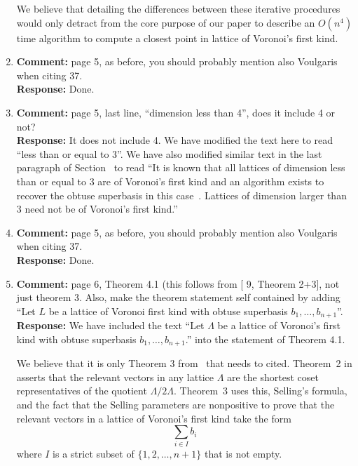 \documentclass[a4paper,10pt]{article}
\begin{document}
\begin{enumerate}
We believe that detailing the differences between these iterative procedures would only detract from the core purpose of our paper to describe an $O(n^4)$ time algorithm to compute a closest point in lattice of Voronoi's first kind.

\item\textbf{Comment:}  
page 5, as before, you should probably mention also Voulgaris when citing 37. 
\\\textbf{Response:}
Done.

\item\textbf{Comment:}  
page 5, last line, ``dimension less than 4'', does it include 4 or not? 
\\\textbf{Response:}
It does not include 4.  We have modified the text here to read ``less than or equal to $3$''. We have also modified similar text in the last paragraph of Section~ to read ``It is known that all lattices of dimension less than or equal to 3 are of Voronoi's first kind and an algorithm exists to recover the obtuse superbasis in this case~\cite{SPLAG}.  Lattices of dimension larger than 3 need not be of Voronoi's first kind.''

\item\textbf{Comment:}  
page 5, as before, you should probably mention also Voulgaris when citing 37. 
\\\textbf{Response:}
Done.

\item\textbf{Comment:}  
page 6, Theorem 4.1 (this follows from [ 9, Theorem 2+3], not just theorem 3. 
Also, make the theorem statement self contained by adding ``Let $L$ be a lattice of Voronoi first kind with obtuse superbasis $b_1,\dots,b_{n+1}$''. 
\\\textbf{Response:}
We have included the text ``Let $\Lambda$ be a lattice of Voronoi's first kind with obtuse superbasis $b_1,\dots,b_{n+1}$.'' into the statement of Theorem 4.1.

We believe that it is only Theorem 3 from~\cite{ConwaySloane1992_voronoi_lattice_3d_obtuse_superbases} that needs to cited.  Theorem~2 in \cite{ConwaySloane1992_voronoi_lattice_3d_obtuse_superbases} asserts that the relevant vectors in any lattice $\Lambda$ are the shortest coset representatives of the quotient $\Lambda/2\Lambda$.  Theorem~3 uses this, Selling's formula, and the fact that the Selling parameters are nonpositive to prove that the relevant vectors in a lattice of Voronoi's first kind take the form
\[
\sum_{i \in I} b_i
\]
where $I$ is a strict subset of $\{1, 2, \dots, n+1\}$ that is not empty.


\end{enumerate}
\end{document}

